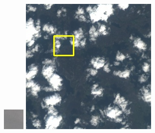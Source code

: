 \documentclass[10pt]{ctexart}
\begin{document}
\begin{multicols}{2}
\begin{figure}[H]
{\begin{minipage}[b]{0.15\linewidth}
            \includegraphics[width=1\linewidth]{../log/spoon2/cut/tmp_cut_LC81321192014054LGN00_03055_color.jpg}\vspace{4pt}
            \includegraphics[width=1\linewidth]{../log/spoon2/cut/LC80350192014190LGN00_06561_color.jpg}\vspace{4pt}

\end{minipage}}
\end{figure}
\end{multicols}
\end{document}
